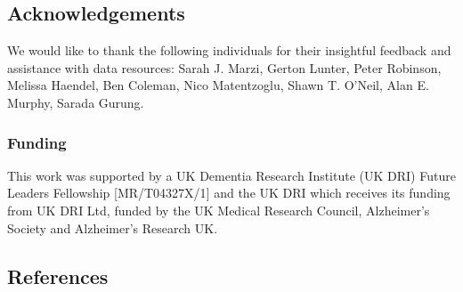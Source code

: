 \documentclass[
]{article}
\begin{document}
\subsection{Acknowledgements}\label{acknowledgements}

We would like to thank the following individuals for their insightful
feedback and assistance with data resources: Sarah J. Marzi, Gerton
Lunter, Peter Robinson, Melissa Haendel, Ben Coleman, Nico Matentzoglu,
Shawn T. O'Neil, Alan E. Murphy, Sarada Gurung.

\subsubsection{Funding}\label{funding}

This work was supported by a UK Dementia Research Institute (UK DRI)
Future Leaders Fellowship {[}MR/T04327X/1{]} and the UK DRI which
receives its funding from UK DRI Ltd, funded by the UK Medical Research
Council, Alzheimer's Society and Alzheimer's Research UK.

\subsection*{References}\label{references}
\end{document}
